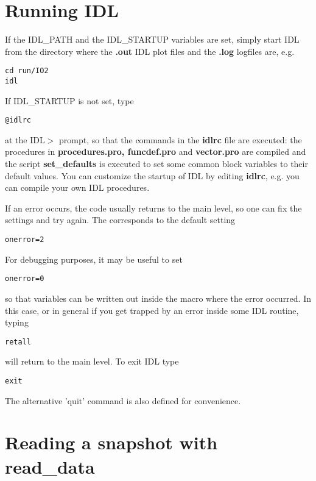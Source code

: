 \documentclass{article}
\begin{document}
\section{Running IDL \label{s-run-idl}}

If the IDL\_PATH and the IDL\_STARTUP variables are set, simply 
start IDL from the directory where the {\bf *.out} IDL plot files
and the {\bf *.log} logfiles are, e.g.
\begin{verbatim}
cd run/IO2
idl
\end{verbatim}
If IDL\_STARTUP is not set, type
\begin{verbatim}
@idlrc
\end{verbatim}
at the IDL$>$ prompt, so that the commands in the {\bf idlrc} file are
executed: 
the procedures in {\bf procedures.pro, funcdef.pro} and 
{\bf vector.pro} are compiled and 
the script {\bf set\_defaults} is executed to set some
common block variables to their default values. You can customize the startup
of IDL by editing {\bf idlrc}, e.g. you can
compile your own IDL procedures. 

If an error occurs, the code usually returns to the main level, so one
can fix the settings and try again. The corresponds to the default 
setting
\begin{verbatim}
onerror=2
\end{verbatim}
   For debugging purposes, it may be useful to set 
\begin{verbatim}
onerror=0
\end{verbatim}
so that variables can be written out inside the macro where the error
occurred. In this case, or in general if you get trapped by an error 
inside some IDL routine, typing
\begin{verbatim}
retall
\end{verbatim}
will return to the main level. To exit IDL type
\begin{verbatim}
exit
\end{verbatim}
The alternative 'quit' command is also defined for convenience.

\section{Reading a snapshot with read\_data \label{s-readdata}}
\end{document}
